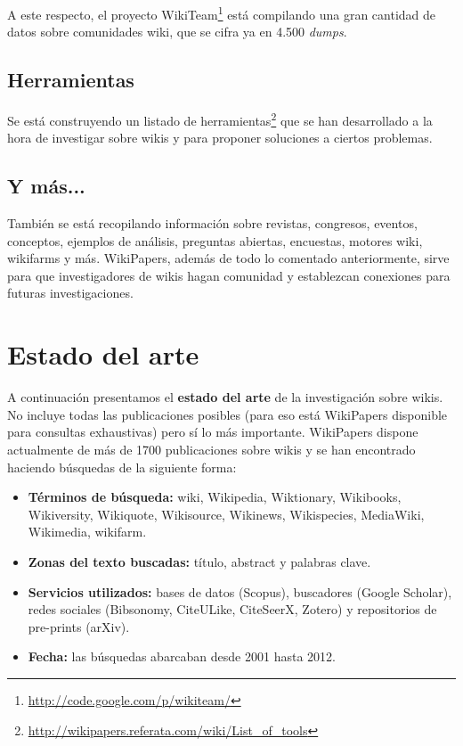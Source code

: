 \documentclass[11pt,onecolumn]{article}
\begin{document}
A este respecto, el proyecto WikiTeam\footnote{\href{http://code.google.com/p/wikiteam/}{http://code.google.com/p/wikiteam/}} está compilando una gran cantidad de datos sobre comunidades wiki, que se cifra ya en 4.500 \emph{dumps}.

\subsection{Herramientas}
Se está construyendo un listado de herramientas\footnote{\href{http://wikipapers.referata.com/wiki/List_of_tools}{http://wikipapers.referata.com/wiki/List\_of\_tools}} que se han desarrollado a la hora de investigar sobre wikis y para proponer soluciones a ciertos problemas.

\subsection{Y más...}
También se está recopilando información sobre revistas, congresos, eventos, conceptos, ejemplos de análisis, preguntas abiertas, encuestas, motores wiki, wikifarms y más. WikiPapers, además de todo lo comentado anteriormente, sirve para que investigadores de wikis hagan comunidad y establezcan conexiones para futuras investigaciones.

\clearpage

\section{Estado del arte}


A continuación presentamos el \textbf{estado del arte} de la investigación sobre wikis. No incluye todas las publicaciones posibles (para eso está WikiPapers disponible para consultas exhaustivas) pero sí lo más importante. WikiPapers dispone actualmente de más de 1700 publicaciones sobre wikis y se han encontrado haciendo búsquedas de la siguiente forma:
\begin{itemize}
\item \textbf{Términos de búsqueda:}  wiki, Wikipedia, Wiktionary, Wikibooks, Wikiversity, Wikiquote, Wikisource, Wikinews, Wikispecies, MediaWiki, Wikimedia, wikifarm.
\item \textbf{Zonas del texto buscadas:} título, abstract y palabras clave.
\item \textbf{Servicios utilizados:} bases de datos (Scopus), buscadores (Google Scholar), redes sociales (Bibsonomy, CiteULike, CiteSeerX, Zotero) y repositorios de pre-prints (arXiv).
\item \textbf{Fecha:} las búsquedas abarcaban desde 2001 hasta 2012.
\end{itemize}
\end{document}
